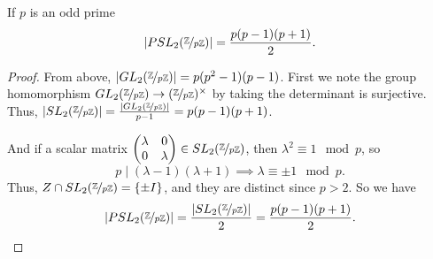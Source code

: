 \leavevmode
\begin{lemma}
    If \(p\) is an odd prime
    \[
        \left\vert PSL_2(\nicefrac{\mathbb{\MakeUppercase{Z}}}{p\mathbb{\MakeUppercase{Z}}}) \right\vert = \frac{p(p-1)(p+1)}{2}.
    \]
\end{lemma}
\begin{proof}
    From above, \(\left\vert GL_2(\nicefrac{\mathbb{\MakeUppercase{Z}} }{p\mathbb{\MakeUppercase{Z}} }) \right\vert = p(p^2 - 1)(p-1)\). First we note the group homomorphism \(GL_2(\nicefrac{\mathbb{\MakeUppercase{Z}} }{p\mathbb{\MakeUppercase{Z}}})\to (\nicefrac{\mathbb{\MakeUppercase{Z}}}{p\mathbb{\MakeUppercase{Z}}})^{\times}\) by taking the determinant is surjective. Thus, \(\left\vert SL_2(\nicefrac{\mathbb{\MakeUppercase{Z}} }{p\mathbb{\MakeUppercase{Z}} })\right\vert = \frac{\left\vert GL_2(\nicefrac{\mathbb{\MakeUppercase{Z}}}{p\mathbb{\MakeUppercase{Z}} })\right\vert}{p - 1} = p(p - 1)(p + 1)\).
    
    And if a scalar matrix \(\begin{pmatrix}
        \lambda &  0 \\
        0 &  \lambda \\
    \end{pmatrix} \in SL_2(\nicefrac{\mathbb{\MakeUppercase{Z}} }{p \mathbb{\MakeUppercase{Z}} })\), then \(\lambda^2 \equiv 1 \mod p\), so
    \[p \mid (\lambda-1)(\lambda + 1)\implies \lambda\equiv \pm 1 \mod p.\]
    Thus, \(Z \cap SL_2(\nicefrac{\mathbb{\MakeUppercase{Z}} }{p\mathbb{\MakeUppercase{Z}} }) = \{\pm I\}\), and they are distinct since \(p > 2\). So we have
    \[\left\vert PSL_2(\nicefrac{\mathbb{\MakeUppercase{Z}} }{p\mathbb{\MakeUppercase{Z}} })\right\vert = \frac{\left\vert SL_2(\nicefrac{\mathbb{\MakeUppercase{Z}}}{p\mathbb{\MakeUppercase{Z}} })\right\vert}{2} = \frac{p(p - 1)(p + 1)}{2}.\]
\end{proof}
